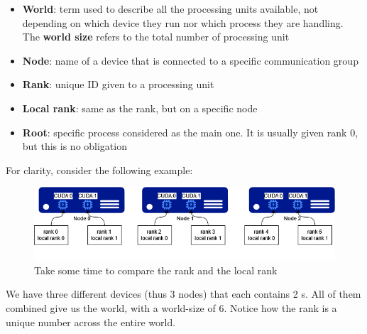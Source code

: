 \documentclass{article}
\begin{document}
\begin{itemize}
  \item \textbf{World}: term used to describe all the processing units available, not depending on which device they run nor which process they are handling. The \textbf{world size} refers to the total number of processing unit
  \item \textbf{Node}: name of a device that is connected to a specific communication group
  \item \textbf{Rank}: unique ID given to a processing unit
  \item \textbf{Local rank}: same as the rank, but on a specific node
  \item \textbf{Root}: specific process considered as the main one. It is usually given rank 0, but this is no obligation
\end{itemize}
For clarity, consider the following example:
\begin{figure}[h!]
  \center
  \includegraphics[width=0.7\linewidth]{images/2022-08-24-17-37-31.png}
  \caption{Take some time to compare the rank and the local rank}
\end{figure}
\FloatBarrier

We have three different devices (thus 3 nodes) that each contains 2 s. All of them combined give us the world, with a world-size of 6. Notice how the rank is a unique number across the entire world.
\end{document}
